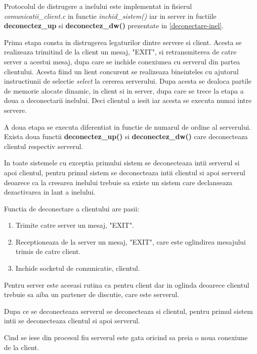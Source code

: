 \hspace{5mm}Protocolul de distrugere a inelului este implementat in
fisierul {\it comunicatii\_client.c} in functie {\it inchid\_sistem()} iar
in server in fuctiile {\bf deconectez\_up} si {\bf deconectez\_dw()}
prezentate in \ref{deconectare-inel}.

Prima etapa consta in distrugerea legaturilor dintre servere si client.
Acesta se realizeaza trimitind de la client un mesaj, "EXIT", si
retransmiterea de catre server a acestui mesaj, dupa care se inchide
conexiunea cu serverul din partea clientului. Acesta fiind un lient
concurent se realizeaza bineinteles cu ajutorul instructiunii de selectie
{\it select} la cererea serverului. Dupa acesta se dealoca partile de
memorie alocate dinamic, in client si in server, dupa care se trece la etapa
a doua a deconectarii inelului. Deci clientul a iesit iar acesta se executa
numai intre servere.

A doua etapa se executa diferentiat in functie de numarul de ordine al
serverului. Exista doua functii {\bf deconectez\_up()} si {\bf
deconectez\_dw()} care deconecteaza clientul respectiv serverul.

In toate sistemele cu exceptia primului sistem se deconecteaza intii
serverul si apoi clientul, pentru primul sistem se deconecteaza intii
clientul si apoi serverul deoarece ca la creearea inelului trebuie sa existe
un sistem care declanseaza dezactivarea in lant a inelului.

Functia de deconectare a clientului are pasii:

\begin{enumerate}
\item Trimite catre server un mesaj, "EXIT".
\item Receptioneaza de la server un mesaj, "EXIT", care este oglindirea
mesajului trimis de catre client.
\item Inchide socketul de comunicatie, clientul.
\end{enumerate}

Pentru server este aceeasi rutina ca pentru client dar in oglinda deoarece
clientul trebuie sa aiba un partener de discutie, care este serverul.

Dupa ce se deconecteaza serverul se deconecteaza si clientul, pentru primul
sistem intii se deconecteaza clientul si apoi serverul.

Cind se iese din procesul fiu serverul este gata oricind sa preia o noua
conexiune de la client.